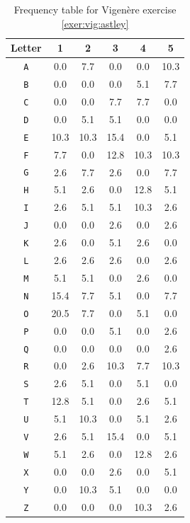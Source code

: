 \documentclass{book}
\theoremstyle{plain}
\theoremstyle{definition}
\newcommand{\ciphertext}[1]{\texttt{#1}} %
\begin{document}
\begin{table}[H]
\begin{center}
\begin{tabular}{c|ccccc}
Letter & 1 & 2 & 3 & 4 & 5 \\
\hline
\ciphertext{A} & 0.0 & 7.7 & 0.0 & 0.0 & 10.3 \\
\ciphertext{B} & 0.0 & 0.0 & 0.0 & 5.1 & 7.7 \\
\ciphertext{C} & 0.0 & 0.0 & 7.7 & 7.7 & 0.0 \\
\ciphertext{D} & 0.0 & 5.1 & 5.1 & 0.0 & 0.0 \\
\ciphertext{E} & 10.3 & 10.3 & 15.4 & 0.0 & 5.1 \\
\ciphertext{F} & 7.7 & 0.0 & 12.8 & 10.3 & 10.3 \\
\ciphertext{G} & 2.6 & 7.7 & 2.6 & 0.0 & 7.7 \\
\ciphertext{H} & 5.1 & 2.6 & 0.0 & 12.8 & 5.1 \\
\ciphertext{I} & 2.6 & 5.1 & 5.1 & 10.3 & 2.6 \\
\ciphertext{J} & 0.0 & 0.0 & 2.6 & 0.0 & 2.6 \\
\ciphertext{K} & 2.6 & 0.0 & 5.1 & 2.6 & 0.0 \\
\ciphertext{L} & 2.6 & 2.6 & 2.6 & 0.0 & 2.6 \\
\ciphertext{M} & 5.1 & 5.1 & 0.0 & 2.6 & 0.0 \\
\ciphertext{N} & 15.4 & 7.7 & 5.1 & 0.0 & 7.7 \\
\ciphertext{O} & 20.5 & 7.7 & 0.0 & 5.1 & 0.0 \\
\ciphertext{P} & 0.0 & 0.0 & 5.1 & 0.0 & 2.6 \\
\ciphertext{Q} & 0.0 & 0.0 & 0.0 & 0.0 & 2.6 \\
\ciphertext{R} & 0.0 & 2.6 & 10.3 & 7.7 & 10.3 \\
\ciphertext{S} & 2.6 & 5.1 & 0.0 & 5.1 & 0.0 \\
\ciphertext{T} & 12.8 & 5.1 & 0.0 & 2.6 & 5.1 \\
\ciphertext{U} & 5.1 & 10.3 & 0.0 & 5.1 & 2.6 \\
\ciphertext{V} & 2.6 & 5.1 & 15.4 & 0.0 & 5.1 \\
\ciphertext{W} & 5.1 & 2.6 & 0.0 & 12.8 & 2.6 \\
\ciphertext{X} & 0.0 & 0.0 & 2.6 & 0.0 & 5.1 \\
\ciphertext{Y} & 0.0 & 10.3 & 5.1 & 0.0 & 0.0 \\
\ciphertext{Z} & 0.0 & 0.0 & 0.0 & 10.3 & 2.6
\end{tabular}
\caption{Frequency table for Vigen\`{e}re exercise \ref{exer:vig:astley}}
\label{app:vig:astley}
\end{center}
\end{table}
\end{document}
